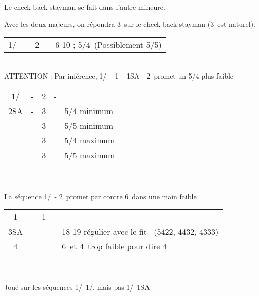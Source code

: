 \documentclass[a4paper, oneside, 11pt]{report}
\begin{document}
		Le check back stayman se fait dans l'autre mineure.

		Avec les deux majeurs, on répondra 3\coeur\ sur le check back stayman (3\carreau\ est naturel).\\

		\begin{tabular}{cccc|l}
		1\trefle/\carreau & - & 2\coeur && 6-10 ; 5\pique/4\coeur\ (Possiblement 5/5)\\
		\end{tabular}\\
		ATTENTION : Par inférence, 1\trefle/\carreau\ - 1\pique\ - 1SA - 2\coeur\ promet un 5/4 plus faible\\
	
		\begin{tabular}{cccc|l}
		1\trefle/\carreau & - & 2\coeur & - &\\
		2SA & - & 3\trefle && 5/4 minimum\\
		&& 3\carreau && 5/5 minimum\\
		&& 3\coeur && 5/4 maximum\\
		&& 3\pique && 5/5 maximum\\
		\end{tabular}\\\\
	
		La séquence 1\trefle/\carreau\ - 2\pique\ promet par contre 6\pique\ dans une main faible\\

		\begin{tabular}{cccc|l}
		1\trefle & - & 1\coeur &&\\
		3SA &&&& 18-19 régulier avec le fit \coeur\ (5422, 4432, 4333)\\
		4\coeur &&&& 6\trefle\ et 4\coeur\ trop faible pour dire 4\trefle\\
		\end{tabular}\\\\

		Joué sur les séquences 1\trefle/\carreau\ 1\coeur/\pique,  mais pas 1\trefle/\carreau\ 1SA\\
\end{document}
